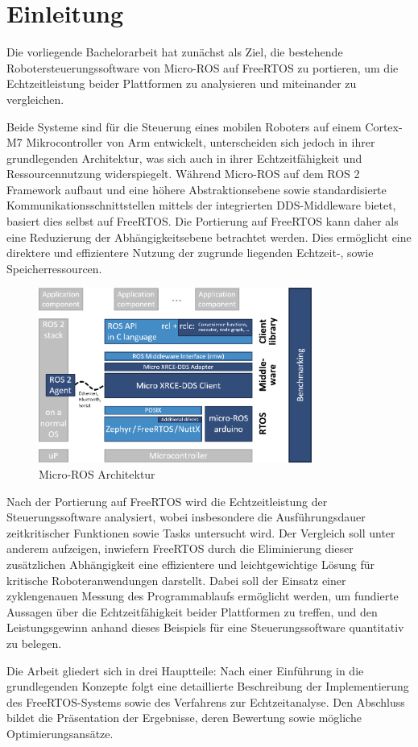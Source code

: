\section*{Einleitung}

Die vorliegende Bachelorarbeit hat zunächst als Ziel, die bestehende
Robotersteuerungssoftware von Micro-ROS auf FreeRTOS zu portieren, um die
Echtzeitleistung beider Plattformen zu analysieren und miteinander zu
vergleichen.

Beide Systeme sind für die Steuerung eines mobilen Roboters auf einem Cortex-M7
Mikrocontroller von Arm entwickelt, unterscheiden sich jedoch in ihrer
grundlegenden Architektur, was sich auch in ihrer Echtzeitfähigkeit und
Ressourcennutzung widerspiegelt. Während Micro-ROS auf dem \ac{ROS 2} Framework
aufbaut und eine höhere Abstraktionsebene sowie standardisierte
Kommunikationsschnittstellen mittels der integrierten \ac{DDS}-Middleware
bietet, basiert dies selbst auf FreeRTOS. Die Portierung auf FreeRTOS kann daher
als eine Reduzierung der Abhängigkeitsebene betrachtet werden. Dies ermöglicht
eine direktere und effizientere Nutzung der zugrunde liegenden Echtzeit-, sowie
Speicherressourcen.

\begin{figure}[htb] \centering
    \includegraphics[width=0.8\textwidth]{assets/Micro-ROS_architecture}
    \caption{Micro-ROS Architektur\cite[S. 6]{koubaa2023}}
\end{figure}

Nach der Portierung auf FreeRTOS wird die Echtzeitleistung der
Steuerungssoftware analysiert, wobei insbesondere die Ausführungsdauer
zeitkritischer Funktionen sowie Tasks untersucht wird. Der Vergleich soll unter
anderem aufzeigen, inwiefern FreeRTOS durch die Eliminierung dieser zusätzlichen
Abhängigkeit eine effizientere und leichtgewichtige Lösung für kritische
Roboteranwendungen darstellt. Dabei soll der Einsatz einer zyklengenauen Messung
des Programmablaufs ermöglicht werden, um fundierte Aussagen über die
Echtzeitfähigkeit  beider Plattformen zu treffen, und den Leistungsgewinn anhand
dieses  Beispiels für eine Steuerungssoftware quantitativ zu belegen.

Die Arbeit gliedert sich in drei Hauptteile: Nach einer Einführung in die
grundlegenden Konzepte folgt eine detaillierte Beschreibung der Implementierung
des FreeRTOS-Systems sowie des Verfahrens zur Echtzeitanalyse. Den Abschluss
bildet die Präsentation der Ergebnisse, deren Bewertung sowie mögliche
Optimierungsansätze.
